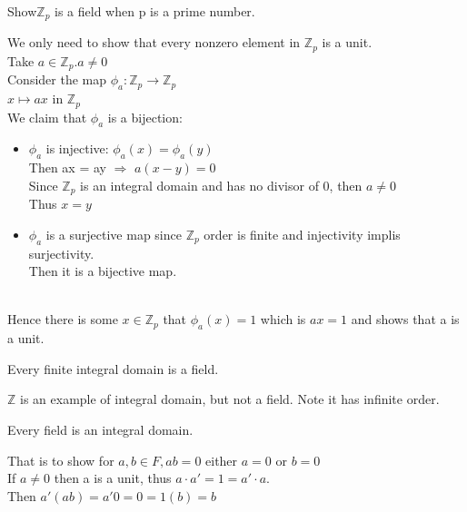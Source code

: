 \documentclass{article}
\newcommand\Z{\ensuremath{\mathbb{Z}}}
\begin{document}
\begin{Example}
    Show$ \Z_p$ is a field when p is a prime number. 
\end{Example}
\begin{Proof}
    We only need to show that every nonzero element in $\Z_p$ is a unit.
    \\Take $a \in \Z_p. a\neq 0$ 
    \\Consider the map $\phi_a : \Z_p \rightarrow \Z_p $
    \\ \hspace*{3.5cm} $x \mapsto ax$ in $\Z_p$
    \\ We claim that $\phi_a $ is a bijection:
    \begin{itemize}
        \item $\phi_a$ is injective: $\phi_a(x) = \phi_a(y)$
        \\Then ax = ay $\Rightarrow$ $a(x-y) = 0$
        \\ Since $\Z_p$ is an integral domain and has no divisor of 0, then $a\neq0$
        \\ Thus $x = y$
    \end{itemize}
    \begin{itemize}
        \item $\phi_a$ is a surjective map since $\Z_p$ order is finite and injectivity implis surjectivity. \\ Then it is a bijective map.
    \end{itemize}
    \\Hence there is some $x\in \Z_p$ that $\phi_a(x) = 1$ which is $ax = 1$ and shows that a is a unit. 
\end{Proof}

\begin{theorem}
    Every finite integral domain is a field.
\end{theorem}

\begin{Example}
    $\Z$ is an example of integral domain, but not a field. Note it has infinite order.
\end{Example}

\begin{theorem}
    Every field is an integral domain.
\end{theorem}

\begin{Proof}
    That is to show for $a, b\in F, ab = 0 $ either $ a=0 $ or $ b = 0$
    \\If $a\neq 0$ then a is a unit, thus $a \cdot a' = 1 = a' \cdot a$.
    \\Then $a'(ab) = a'0 = 0 = 1(b) = b$
\end{Proof}
\end{document}
